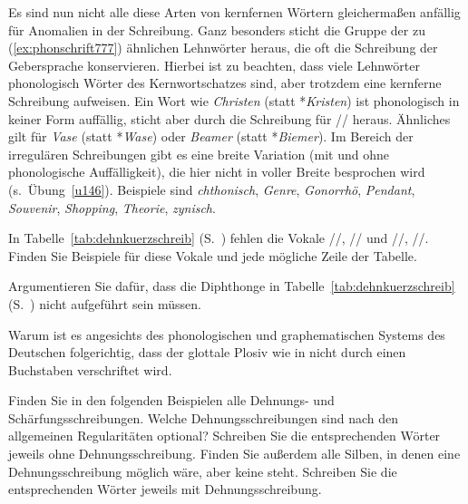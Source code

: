 Es sind nun nicht alle diese Arten von kernfernen Wörtern gleichermaßen anfällig für Anomalien in der Schreibung.
Ganz besonders sticht die Gruppe der zu (\ref{ex:phonschrift777}) ähnlichen Lehnwörter heraus, die oft die Schreibung der Gebersprache konservieren.
Hierbei ist zu beachten, dass viele Lehnwörter phonologisch Wörter des Kernwortschatzes sind, aber trotzdem eine kernferne Schreibung aufweisen.
Ein Wort wie \textit{Christen} (statt *\textit{Kristen}) ist phonologisch in keiner Form auffällig, sticht aber durch die Schreibung \textipa{[chr]} für // heraus.
Ähnliches gilt für \textit{Vase} (statt *\textit{Wase}) oder \textit{Beamer} (statt *\textit{Biemer}).
Im Bereich der irregulären Schreibungen gibt es eine breite Variation (mit und ohne phonologische Auffälligkeit), die hier nicht in voller Breite besprochen wird (s.\ Übung~\ref{u146}).
Beispiele sind \textit{chthonisch}, \textit{Genre}, \textit{Gonorrhö}, \textit{Pendant}, \textit{Souvenir}, \textit{Shopping}, \textit{Theorie}, \textit{zynisch}.




\Uebungen

\Uebung \label{u141} In Tabelle~\ref{tab:dehnkuerzschreib} (S.~\pageref{tab:dehnkuerzschreib}) fehlen die Vokale //, // und /\textipa{\o}/, /\textipa{\oe}/.
Finden Sie Beispiele für diese Vokale und jede mögliche Zeile der Tabelle.

\Uebung[\tristar] \label{u142} Argumentieren Sie dafür, dass die Diphthonge in Tabelle~\ref{tab:dehnkuerzschreib} (S.~\pageref{tab:dehnkuerzschreib}) nicht aufgeführt sein müssen.

\Uebung[\tristar] \label{u143} Warum ist es angesichts des phonologischen und graphematischen Systems des Deutschen folgerichtig, dass der glottale Plosiv wie in \textipa{[PEnd@]} nicht durch einen Buchstaben verschriftet wird.

\Uebung \label{u144} Finden Sie in den folgenden Beispielen alle Dehnungs- und Schärfungsschreibungen.
Welche Dehnungsschreibungen sind nach den allgemeinen Regularitäten optional?
Schreiben Sie die entsprechenden Wörter jeweils ohne Dehnungsschreibung.
Finden Sie außerdem alle Silben, in denen eine Dehnungsschreibung möglich wäre, aber keine steht.
Schreiben Sie die entsprechenden Wörter jeweils mit Dehnungsschreibung.

